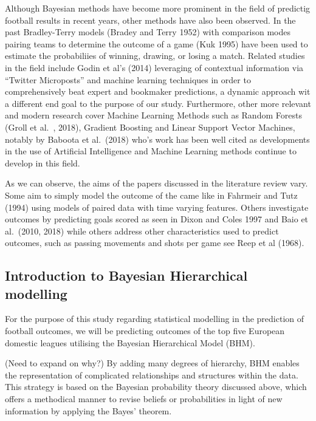 \documentclass[
]{article}
\begin{document}
Although Bayesian methods have become more prominent in the field of
predictig football results in recent years, other methods have also been
observed. In the past Bradley-Terry models (Bradey and Terry 1952) with
comparison modes pairing teams to determine the outcome of a game (Kuk
1995) have been used to estimate the probabiliies of winning, drawing,
or losing a match. Related studies in the field include Godin et al's
(2014) leveraging of contextual information via ``Twitter Microposts''
and machine learning techniques in order to comprehensively beat expert
and bookmaker predictions, a dynamic approach wit a different end goal
to the purpose of our study. Furthermore, other more relevant and modern
research cover Machine Learning Methods such as Random Forests (Groll et
al.~, 2018), Gradient Boosting and Linear Support Vector Machines,
notably by Baboota et al.~(2018) who's work has been well cited as
developments in the use of Artificial Intelligence and Machine Learning
methods continue to develop in this field.

As we can observe, the aims of the papers discussed in the literature
review vary. Some aim to simply model the outcome of the came like in
Fahrmeir and Tutz (1994) using models of paired data with time varying
features. Others investigate outcomes by predicting goals scored as seen
in Dixon and Coles 1997 and Baio et al.~(2010, 2018) while others
address other characteristics used to predict outcomes, such as passing
movements and shots per game see Reep et al (1968).

\hypertarget{introduction-to-bayesian-hierarchical-modelling}{%
\subsection{Introduction to Bayesian Hierarchical
modelling}\label{introduction-to-bayesian-hierarchical-modelling}}

For the purpose of this study regarding statistical modelling in the
prediction of football outcomes, we will be predicting outcomes of the
top five European domestic leagues utilising the Bayesian Hierarchical
Model (BHM).

(Need to expand on why?) By adding many degrees of hierarchy, BHM
enables the representation of complicated relationships and structures
within the data. This strategy is based on the Bayesian probability
theory discussed above, which offers a methodical manner to revise
beliefs or probabilities in light of new information by applying the
Bayes' theorem.
\end{document}
